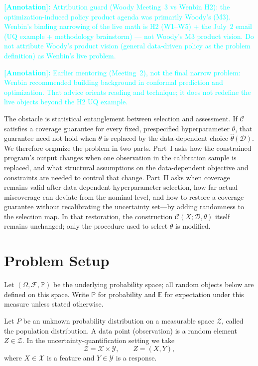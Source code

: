 \documentclass[12pt]{article}
\theoremstyle{plain}
\newcommand{\annote}[1]{\textcolor{cyan}{\textbf{[Annotation]:} #1}}
\begin{document}
\annote{Attribution guard (Woody Meeting~3 vs Wenbin H2): the optimization-induced policy product agenda was primarily Woody's (M3).
Wenbin's binding narrowing of the live math is H2 (W1--W5) + the July~2 email (UQ example + methodology brainstorm) --- not Woody's M3 product vision.
Do not attribute Woody's product vision (general data-driven policy as the problem definition) as Wenbin's live problem.}

\annote{Earlier mentoring (Meeting~2), not the final narrow problem: Wenbin recommended building background in conformal prediction and optimization.
That advice orients reading and technique; it does not redefine the live objects beyond the H2 UQ example.}

The obstacle is statistical entanglement between selection and assessment.
If $\mathcal{C}$ satisfies a coverage guarantee for every fixed, prespecified hyperparameter $\theta$, that guarantee need not hold when $\theta$ is replaced by the data-dependent choice $\hat\theta(\mathcal{D})$.
We therefore organize the problem in two parts.
Part~I asks how the constrained program's output changes when one observation in the calibration sample is replaced, and what structural assumptions on the data-dependent objective and constraints are needed to control that change.
Part~II asks when coverage remains valid after data-dependent hyperparameter selection, how far actual miscoverage can deviate from the nominal level, and how to restore a coverage guarantee without recalibrating the uncertainty set---by adding randomness to the selection map.
In that restoration, the construction $\mathcal{C}(X;\mathcal{D},\theta)$ itself remains unchanged; only the procedure used to select $\theta$ is modified.

\section{Problem Setup}
\label{sec:setup}

\label{def:prob-space}
Let $(\Omega,\mathcal{F},\mathbb{P})$ be the underlying probability space; all random objects below are defined on this space.
Write $\mathbb{P}$ for probability and $\mathbb{E}$ for expectation under this measure unless stated otherwise.

\label{def:P}
Let $P$ be an unknown probability distribution on a measurable space $\mathcal{Z}$, called the population distribution.
\label{def:Zi}
A data point (observation) is a random element $Z\in\mathcal{Z}$.
In the uncertainty-quantification setting we take
\[
\mathcal{Z}=\mathcal{X}\times\mathcal{Y},
\qquad
Z=(X,Y),
\]
where $X\in\mathcal{X}$ is a feature and $Y\in\mathcal{Y}$ is a response.
\end{document}
